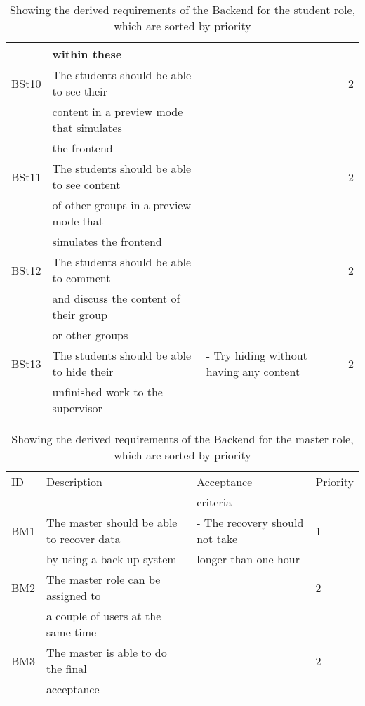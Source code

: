 \begin{table}[h]
\begin{tabular}{llll}
	& within these							&	& \\
\hline
BSt10& The students should be able to see their &  & 2\\
	& content in a preview mode that simulates	&	&	\\
	& the frontend	&	& \\
\hline
BSt11& The students should be able to see content &  & 2\\
	& of other groups in a preview mode that 	&	&	\\
	& simulates the frontend	&	& \\
\hline
BSt12& The students should be able to comment  	&  & 2\\
	& and discuss the content of their group		&	 & \\
	& or other groups						&	 & \\
\hline
BSt13& The students should be able to hide their & - Try hiding without having any content & 2\\
	& unfinished work to the supervisor		&	& \\
	\bottomrule
\end{tabular}
\caption{Showing the derived requirements of the Backend for the student role, which are sorted by priority}
\label{RequirementsBackendStudent}
\end{table}

\begin{table}[h]
\centering%
\begin{tabular}{llll}
	\toprule
ID 	& Description 	& Acceptance 	& Priority \\
 	& 			 & criteria 	&  \\
\cmidrule(rl){1-1}\cmidrule(rl){2-2}\cmidrule(rl){3-3}\cmidrule(rl){4-4}
BM1 & The master should be able to recover data 	& - The recovery should not take & 1	\\
 	& by using a back-up system					& longer than one hour & 		\\
\hline
BM2 & The master role can be assigned to 		&  & 2	\\
 	& a couple of users at the same time 		&  & 	\\
\hline
BM3 & The master is able to do the final  		&  & 2\\
 	& acceptance 							&  & \\
	\bottomrule
\end{tabular}
\caption{Showing the derived requirements of the Backend for the master role, which are sorted by priority}
\label{RequirementsBackendMaster}
\end{table}


